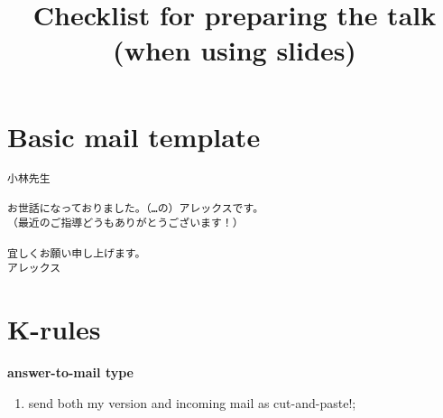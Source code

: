 \documentclass[12pt]{article} %
\title{Checklist for preparing the talk (when using slides)}
\begin{document}
\section{Basic mail template}
\begin{verbatim}
小林先生

お世話になっておりました。（…の）アレックスです。
（最近のご指導どうもありがとうございます！）

宜しくお願い申し上げます。
アレックス
\end{verbatim}
\section{K-rules}
\textbf{answer-to-mail type}
\begin{enumerate}
	\item send both my version and incoming mail as cut-and-paste!;
\end{enumerate}
\end{document}

